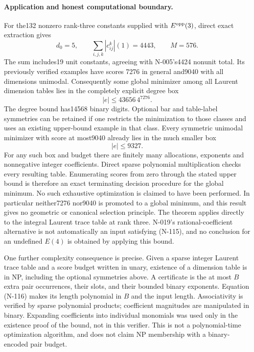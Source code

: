 \paragraph{Application and honest computational boundary.}
For the132 nonzero rank-three constants supplied with
$E^{\rm opp}(3)$, direct exact extraction gives
\[
 d_0=5,\qquad
 \sum_{i,j,k}|c_{ij}^k|(1)=4443,\qquad M=576.
 \tag{N-124}
\]
The sum includes19 unit constants, agreeing with N-005's4424
nonunit total.  Its previously verified examples have scores
7276 in general and9040 with all dimensions unimodal.
Consequently some global minimizer among all Laurent dimension
tables lies in the completely explicit degree box
\[
             |e|\le43656\,4^{7276}.
 \tag{N-125}
\]
The degree bound has14568 binary digits.  Optional bar and
table-label symmetries can be retained if one restricts the
minimization to those classes and uses an existing upper-bound
example in that class.  Every symmetric unimodal minimizer
with score at most9040 already lies in the much smaller box
\[
                         |e|\le9327.
 \tag{N-126}
\]
For any such box and budget there are finitely many allocations,
exponents and nonnegative integer coefficients.  Direct sparse
polynomial multiplication checks every resulting table.  Enumerating
scores from zero through the stated upper bound is therefore an
exact terminating decision procedure for the global minimum.
No such exhaustive optimization is claimed to have been performed.
In particular neither7276 nor9040 is promoted to a global minimum,
and this result gives no geometric or canonical selection principle.
The theorem applies directly to the integral Laurent trace table
at rank three.  N-019's rational-coefficient alternative is not
automatically an input satisfying (N-115), and no conclusion for
an undefined $E(4)$ is obtained by applying this bound.

One further complexity consequence is precise.  Given a sparse
integer Laurent trace table and a score budget written in unary,
existence of a dimension table is in NP, including the optional
symmetries above.  A certificate is the at most $B$ extra pair
occurrences, their slots, and their bounded binary exponents.
Equation (N-116) makes its length polynomial in $B$ and the input
length.  Associativity is verified by sparse polynomial products;
coefficient magnitudes are manipulated in binary.  Expanding
coefficients into individual monomials was used only in the
existence proof of the bound, not in this verifier.  This is not
a polynomial-time optimization algorithm, and does not claim
NP membership with a binary-encoded pair budget.

